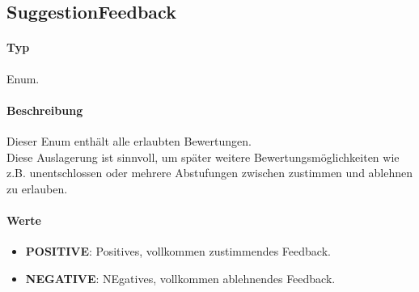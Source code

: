 \subsection{SuggestionFeedback}
\paragraph*{Typ}
Enum.
\paragraph*{Beschreibung}
Dieser Enum enthält alle erlaubten Bewertungen.\\
Diese Auslagerung ist sinnvoll, um später weitere Bewertungsmöglichkeiten wie z.B. unentschlossen oder 
mehrere Abstufungen zwischen zustimmen und ablehnen zu erlauben.

\paragraph*{Werte}
\begin{itemize}
    \item \textbf{POSITIVE}: Positives, vollkommen zustimmendes Feedback.
    \item \textbf{NEGATIVE}: NEgatives, vollkommen ablehnendes Feedback.
\end{itemize}
